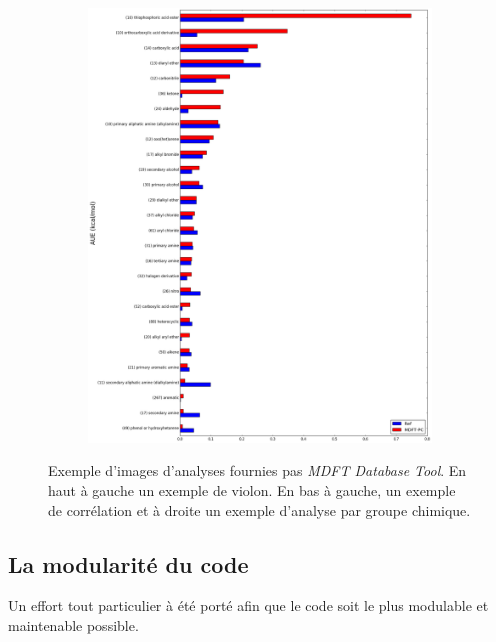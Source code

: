 \begin{figure}[h]
\begin{subfigure}[b]{0.40\textwidth}
   \end{subfigure}
   \hspace{5mm}
   \begin{subfigure}[b]{0.59\textwidth}
         \includegraphics[width=\textwidth]{chapters/BDD/images/freesolv_1/PC_error_by_groups.png}
    \end{subfigure}
  \caption[Exemple d'images d'analyses fournies pas \textit{MDFT Database Tool}.]{Exemple d'images d'analyses fournies pas \textit{MDFT Database Tool}. En haut à gauche un exemple de violon. En bas à gauche, un exemple de corrélation et à droite un exemple d'analyse par groupe chimique.}
  \label{fig:examples}
\end{figure}


\subsection{La modularité du code}
Un effort tout particulier à été porté afin que le code soit le plus modulable et maintenable possible. 

